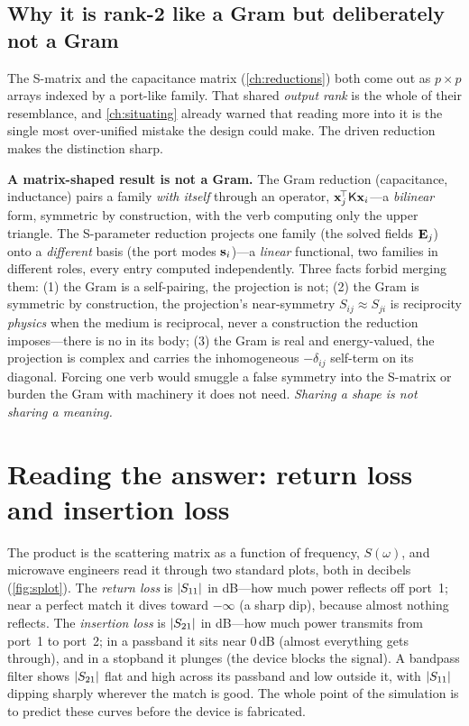 \subsection{Why it is rank-2 like a Gram but deliberately not a Gram}

The S-matrix and the capacitance matrix (\cref{ch:reductions}) both come out as
$p\times p$ arrays indexed by a port-like family. That shared \emph{output rank}
is the whole of their resemblance, and \cref{ch:situating} already warned that
reading more into it is the single most over-unified mistake the design could
make. The driven reduction makes the distinction sharp.

\begin{pitfall}
\textbf{A matrix-shaped result is not a Gram.} The Gram reduction
(capacitance, inductance) pairs a family \emph{with itself} through an operator,
$\mathbf{x}_j^{\!\top}\mathsf{K}\mathbf{x}_i$---a \emph{bilinear} form, symmetric by construction, with
the verb computing only the upper triangle. The S-parameter reduction projects one
family (the solved fields $\mathbf{E}_j$) onto a \emph{different} basis (the port modes
$\mathbf{s}_i$)---a \emph{linear} functional, two families in different roles, every entry
computed independently. Three facts forbid merging them: (1) the Gram is a
self-pairing, the projection is not; (2) the Gram is symmetric by construction,
the projection's near-symmetry $S_{ij}\approx S_{ji}$ is reciprocity \emph{physics}
when the medium is reciprocal, never a construction the reduction imposes---there
is no  in its body; (3) the Gram is real and
energy-valued, the projection is complex and carries the inhomogeneous
$-\delta_{ij}$ self-term on its diagonal. Forcing one verb would smuggle a false
symmetry into the S-matrix or burden the Gram with machinery it does not need.
\emph{Sharing a shape is not sharing a meaning.}
\end{pitfall}

\section{Reading the answer: return loss and insertion loss}

The product is the scattering matrix as a function of frequency, $S(\omega)$, and
microwave engineers read it through two standard plots, both in decibels
(\cref{fig:splot}). The \emph{return loss} is $\lvert S_{11}\rvert$ in dB---how much power
reflects off port~1; near a perfect match it dives toward $-\infty$ (a sharp dip),
because almost nothing reflects. The \emph{insertion loss} is $\lvert S_{21}\rvert$ in
dB---how much power transmits from port~1 to port~2; in a passband it sits near
$0\,$dB (almost everything gets through), and in a stopband it plunges (the device
blocks the signal). A bandpass filter shows $\lvert S_{21}\rvert$ flat and high across its
passband and low outside it, with $\lvert S_{11}\rvert$ dipping sharply wherever the match
is good. The whole point of the simulation is to predict these curves before the
device is fabricated.

